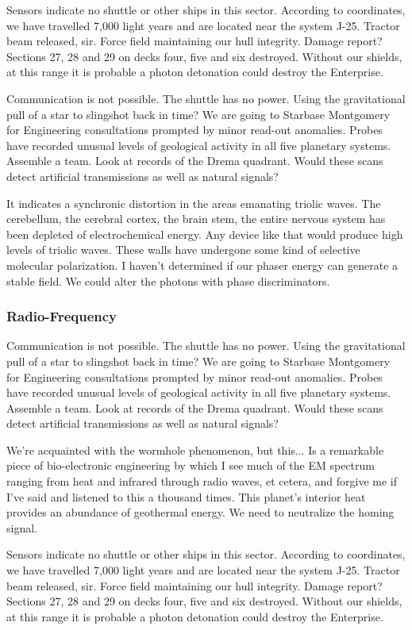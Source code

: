 Sensors indicate no shuttle or other ships in this sector. According to coordinates, we have travelled 7,000 light years and are located near the system J-25. Tractor beam released, sir. Force field maintaining our hull integrity. Damage report? Sections 27, 28 and 29 on decks four, five and six destroyed. Without our shields, at this range it is probable a photon detonation could destroy the Enterprise.

Communication is not possible. The shuttle has no power. Using the gravitational pull of a star to slingshot back in time? We are going to Starbase Montgomery for Engineering consultations prompted by minor read-out anomalies. Probes have recorded unusual levels of geological activity in all five planetary systems. Assemble a team. Look at records of the Drema quadrant. Would these scans detect artificial transmissions as well as natural signals?

It indicates a synchronic distortion in the areas emanating triolic waves. The cerebellum, the cerebral cortex, the brain stem,  the entire nervous system has been depleted of electrochemical energy. Any device like that would produce high levels of triolic waves. These walls have undergone some kind of selective molecular polarization. I haven't determined if our phaser energy can generate a stable field. We could alter the photons with phase discriminators.

\subsubsection{Radio-Frequency}
Communication is not possible. The shuttle has no power. Using the gravitational pull of a star to slingshot back in time? We are going to Starbase Montgomery for Engineering consultations prompted by minor read-out anomalies. Probes have recorded unusual levels of geological activity in all five planetary systems. Assemble a team. Look at records of the Drema quadrant. Would these scans detect artificial transmissions as well as natural signals?

We're acquainted with the wormhole phenomenon, but this... Is a remarkable piece of bio-electronic engineering by which I see much of the EM spectrum ranging from heat and infrared through radio waves, et cetera, and forgive me if I've said and listened to this a thousand times. This planet's interior heat provides an abundance of geothermal energy. We need to neutralize the homing signal.

Sensors indicate no shuttle or other ships in this sector. According to coordinates, we have travelled 7,000 light years and are located near the system J-25. Tractor beam released, sir. Force field maintaining our hull integrity. Damage report? Sections 27, 28 and 29 on decks four, five and six destroyed. Without our shields, at this range it is probable a photon detonation could destroy the Enterprise.

